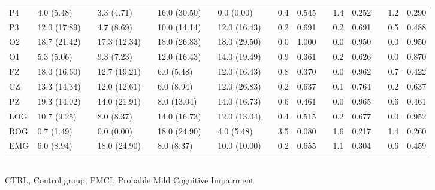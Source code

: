 \documentclass[10pt]{article}
\begin{document}
\begin{table}
\begin{small}
\begin{tabular}{lllllllllllllllll}
P4&4.0 (5.48)&&3.3 (4.71)&&16.0 (30.50)&&0.0 (0.00)&&0.4&0.545&&1.4&0.252&&1.2&0.290 \\
P3&12.0 (17.89)&&4.7 (8.69)&&10.0 (14.14)&&12.0 (16.43)&&0.2&0.691&&0.2&0.691&&0.5&0.488 \\
O2&18.7 (21.42)&&17.3 (12.34)&&18.0 (26.83)&&18.0 (29.50)&&0.0&1.000&&0.0&0.950&&0.0&0.950 \\
O1&5.3 (5.06)&&9.3 (7.23)&&12.0 (16.43)&&14.0 (19.49)&&0.9&0.361&&0.2&0.626&&0.0&0.870 \\
FZ&18.0 (16.60)&&12.7 (19.21)&&6.0 (5.48)&&12.0 (16.43)&&0.8&0.370&&0.0&0.962&&0.7&0.422 \\
CZ&13.3 (14.34)&&12.0 (12.61)&&6.0 (8.94)&&12.0 (26.83)&&0.2&0.637&&0.1&0.764&&0.2&0.637 \\
PZ&19.3 (14.02)&&14.0 (21.91)&&8.0 (13.04)&&14.0 (16.73)&&0.6&0.461&&0.0&0.965&&0.6&0.461 \\
LOG&10.7 (9.25)&&8.0 (8.37)&&14.0 (16.73)&&12.0 (13.04)&&0.4&0.515&&0.2&0.677&&0.0&0.952 \\
ROG&0.7 (1.49)&&0.0 (0.00)&&18.0 (24.90)&&4.0 (5.48)&&3.5&0.080&&1.6&0.217&&1.4&0.260 \\
EMG&6.0 (8.94)&&18.0 (24.90)&&8.0 (8.37)&&10.0 (10.00)&&0.2&0.655&&1.1&0.304&&0.6&0.459 \\
\bottomrule
\end{tabular}\\
CTRL, Control group; PMCI, Probable Mild Cognitive Impairment
\end{small}
\end{table}
\end{document}
